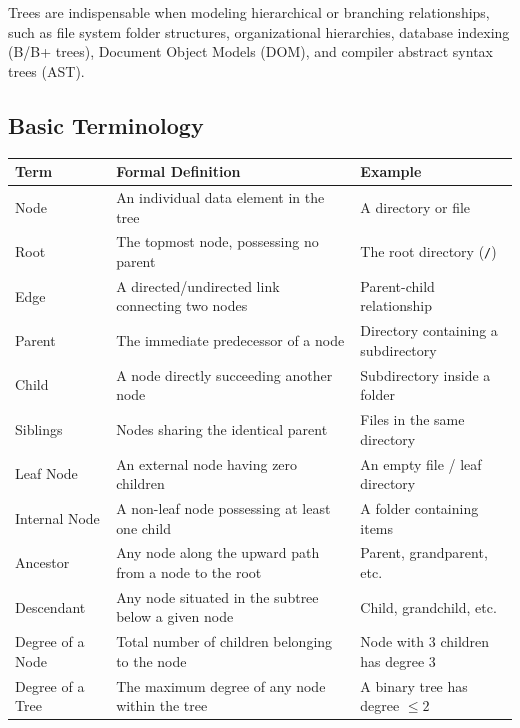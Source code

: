 Trees are indispensable when modeling hierarchical or branching relationships, such as file system folder structures, organizational hierarchies, database indexing (B/B+ trees), Document Object Models (DOM), and compiler abstract syntax trees (AST).

\subsection{Basic Terminology}

\begin{table}[htbp]
\centering
\small
\begin{tabularx}{\textwidth}{l p{7.5cm} X}
\toprule
\textbf{Term} & \textbf{Formal Definition} & \textbf{Example} \\
\midrule
Node             & An individual data element in the tree                      & A directory or file \\
Root             & The topmost node, possessing no parent                      & The root directory (\texttt{/}) \\
Edge             & A directed/undirected link connecting two nodes             & Parent-child relationship \\
Parent           & The immediate predecessor of a node                         & Directory containing a subdirectory \\
Child            & A node directly succeeding another node                     & Subdirectory inside a folder \\
Siblings         & Nodes sharing the identical parent                          & Files in the same directory \\
Leaf Node        & An external node having zero children                       & An empty file / leaf directory \\
Internal Node    & A non-leaf node possessing at least one child               & A folder containing items \\
Ancestor         & Any node along the upward path from a node to the root      & Parent, grandparent, etc. \\
Descendant       & Any node situated in the subtree below a given node         & Child, grandchild, etc. \\
Degree of a Node & Total number of children belonging to the node              & Node with 3 children has degree 3 \\
Degree of a Tree & The maximum degree of any node within the tree              & A binary tree has degree $\leq 2$ \\

\end{tabularx}
\end{table}
